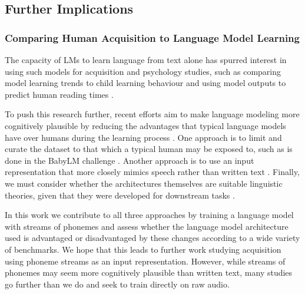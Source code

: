 

\subsection{Further Implications}
\label{sec:further}

\subsubsection{Comparing Human Acquisition to Language Model Learning}
\label{sec:acquisition}


The capacity of LMs to learn language from text alone has spurred interest in using such models for acquisition and psychology studies, such as comparing model learning trends to child learning behaviour \citep{evanson-etal-2023-language} and using model outputs to predict human reading times \citep{hollenstein-etal-2021-multilingual}.

To push this research further, recent efforts aim to make language modeling more cognitively plausible \citep{beinborn2024cognitive} by reducing the advantages that typical language models have over humans during the learning process \citep{warstadt-2022-artificial}. One approach is to limit and curate the dataset to that which a typical human may be exposed to, such as is done in the BabyLM challenge \citep{warstadt-2023-babylm-findings}. Another approach is to use an input representation that more closely mimics speech rather than written text \citep{dupoux-2018-cognitive}. Finally, we must consider whether the architectures themselves are suitable linguistic theories, given that they were developed for downstream tasks \citep{baroni-2022-proper}.

In this work we contribute to all three approaches by training a language model with streams of phonemes and assess whether the language model architecture used is advantaged or disadvantaged by these changes according to a wide variety of benchmarks. We hope that this leads to further work studying acquisition using phoneme streams as an input representation. However, while streams of phonemes may seem more cognitively plausible than written text, many studies go further than we do and seek to train directly on raw audio.

